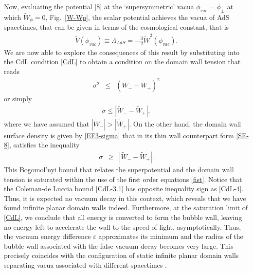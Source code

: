 \documentclass[aps,12pt, a4paper,nofootinbib]{revtex4}
\begin{document}
{Now, evaluating the potential \eqref{8} at the `supersymmetric' vacua $\phi_{vac}=\phi_\pm$ at which $\tilde{W}_\phi=0$, Fig.~\ref{W-Wp}, the scalar potential achieves the vacua of AdS spacetimes, that can be given in terms of the cosmological constant, that is
\begin{eqnarray}\label{CdL-2}
\tilde{V}(\phi_{vac})\equiv \Lambda_{AdS} =-\frac32 \tilde{W}^2(\phi_{vac}).
\end{eqnarray}
We are now able to explore the consequences of this result by substituting into the CdL condition \eqref{CdL} to obtain a condition on the domain wall tension that reads
\begin{eqnarray}\label{CdL-3}
\sigma^2&\leq&( \tilde{W}_- -\tilde{W}_+)^2
\end{eqnarray} 
or simply
\begin{eqnarray}\label{CdL-3.1}
\sigma\leq |\tilde{W}_- -\tilde{W}_+|,
\end{eqnarray} 
where we have assumed that $|\tilde{W}_-|>|\tilde{W}_+|$. On the other hand,  the domain wall surface density is given by \eqref{EF3-sigma} that in  its thin wall counterpart form \eqref{SE-8}, satisfies the inequality  
\begin{eqnarray}\label{CdL-4}
\sigma&\geq& |\tilde{W}_- -\tilde{W}_+|.
\end{eqnarray}
This Bogomol'nyi bound that relates the superpotential and the domain wall tension is  saturated within the use of the first order equations \eqref{fist}.
Notice that the Coleman-de Luccia bound \eqref{CdL-3.1} has opposite inequality sign as \eqref{CdL-4}. Thus, it is expected no vacuum decay in this context, which reveals that we have found infinite planar domain walls indeed. Furthermore, at the saturation limit of \eqref{CdL}, we conclude that all energy is converted to form the bubble wall, leaving no energy left to accelerate the wall to the speed of light,  asymptotically. Thus, the vacuum energy difference $\varepsilon$ approximates its minimum and the radius of the bubble wall associated with the false vacuum decay becomes very large. This precisely coincides with the configuration of static infinite planar domain walls separating vacua associated with different spacetimes \cite{Cvetic:1992st}.


}
\end{document}
